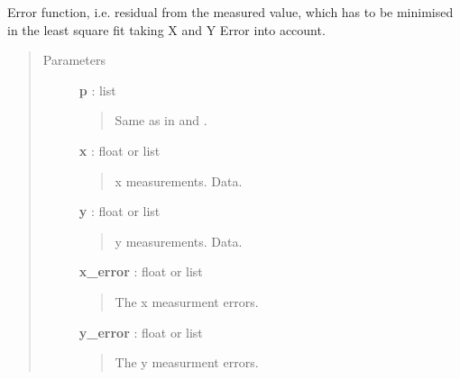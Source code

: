 \documentclass[a4paper,10pt,english]{sphinxmanual}
\begin{document}
\begin{fulllineitems}
\label{functions:astrolyze.functions.astro_functions.linear_error_function}
Error function, i.e. residual from the measured value, which has to be
minimised in the least square fit taking X and Y Error into account.
\begin{quote}\begin{description}
\item[{Parameters }] \leavevmode
\textbf{p} : list
\begin{quote}

Same as in {\hyperref[functions:astrolyze.functions.astro_functions.line]{}} and {\hyperref[functions:astrolyze.functions.astro_functions.anti_line]{}}.
\end{quote}

\textbf{x} : float or list
\begin{quote}

x measurements. Data.
\end{quote}

\textbf{y} : float or list
\begin{quote}

y measurements. Data.
\end{quote}

\textbf{x\_error} : float or list
\begin{quote}

The x measurment errors.
\end{quote}

\textbf{y\_error} : float or list
\begin{quote}

The y measurment errors.
\end{quote}

\end{description}\end{quote}

\end{fulllineitems}

\end{document}
